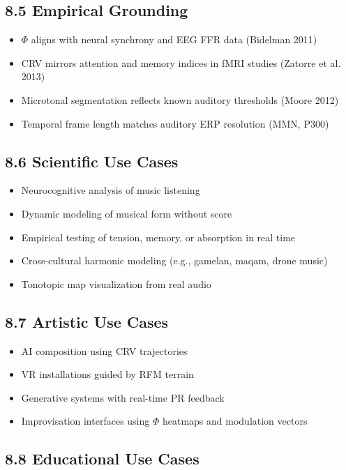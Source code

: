 \subsection*{8.5 Empirical Grounding}

\begin{itemize}
    \item $\Phi$ aligns with neural synchrony and EEG FFR data (Bidelman 2011)
    \item CRV mirrors attention and memory indices in fMRI studies (Zatorre et al. 2013)
    \item Microtonal segmentation reflects known auditory thresholds (Moore 2012)
    \item Temporal frame length matches auditory ERP resolution (MMN, P300)
\end{itemize}

\subsection*{8.6 Scientific Use Cases}

\begin{itemize}
    \item Neurocognitive analysis of music listening
    \item Dynamic modeling of musical form without score
    \item Empirical testing of tension, memory, or absorption in real time
    \item Cross-cultural harmonic modeling (e.g., gamelan, maqam, drone music)
    \item Tonotopic map visualization from real audio
\end{itemize}

\subsection*{8.7 Artistic Use Cases}

\begin{itemize}
    \item AI composition using CRV trajectories
    \item VR installations guided by RFM terrain
    \item Generative systems with real-time PR feedback
    \item Improvisation interfaces using $\Phi$ heatmaps and modulation vectors
\end{itemize}

\subsection*{8.8 Educational Use Cases}

